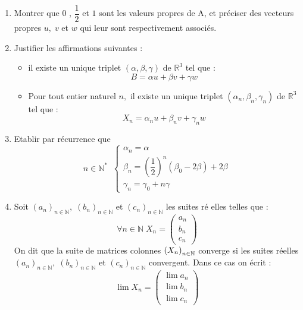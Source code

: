 \documentclass[a4paper, 11pt,reqno]{article}
\begin{document}
\begin{enumerate}
\item Montrer que 0 , $\dfrac{1}{2}$ et $1$ sont les valeurs propres de A,
et préciser des vecteurs propres $u,\;v$ et $w$ qui leur sont respectivement
associés.

\item Justifier les affirmations suivantes :

\begin{itemize}
\item il existe un unique triplet $\left( \alpha ,\beta ,\gamma \right) $ de 
$\mathbb{R}^{3}$ tel que : 
\begin{equation*}
B=\alpha u+\beta v+\gamma w
\end{equation*}

\item Pour tout entier naturel $n,$ il existe un unique triplet $\left(
\alpha _{n},\beta _{n},\gamma _{n}\right) $ de $\mathbb{R}^{3}$ tel que : 
\begin{equation*}
X_{n}=\alpha _{n}u+\beta _{n}v+\gamma _{n}w
\end{equation*}
\end{itemize}

\item Etablir par récurrence que 
\begin{equation*}
n\in \mathbb{N}^{\ast }\;\;\left\{ 
\begin{array}{l}
\alpha _{n}=\alpha \\ 
\beta _{n}=\left( \dfrac{1}{2}\right) ^{n}\left( \beta _{0}-2\beta \right)
+2\beta \\ 
\gamma _{n}=\gamma _{0}+n\gamma%
\end{array}%
\right.
\end{equation*}

\item Soit $\left( a_{n}\right) _{n\in \mathbb{N}},\;\left( b_{n}\right)
_{n\in \mathbb{N}}$ et $\left( c_{n}\right) _{n\in \mathbb{N}}$ les suites ré%
elles telles que : 
\begin{equation*}
\forall n\in \mathbb{N\;}X_{n}=\left( 
\begin{array}{c}
a_{n} \\ 
b_{n} \\ 
c_{n}%
\end{array}%
\right)
\end{equation*}%
On dit que la suite de matrices colonnes $\left( X_{n}\right) _{n\in \mathbb{%
N}}$ converge si les suites réelles $\left( a_{n}\right) _{n\in \mathbb{N}%
},\;\left( b_{n}\right) _{n\in \mathbb{N}}$ et $\left( c_{n}\right) _{n\in 
\mathbb{N}}$ convergent. Dans ce cas on écrit : 
\begin{equation*}
\lim X_{n}=\left( 
\begin{array}{c}
\lim a_{n} \\ 
\lim b_{n} \\ 
\lim c_{n}%
\end{array}%
\right)
\end{equation*}


\end{enumerate}
\end{document}
